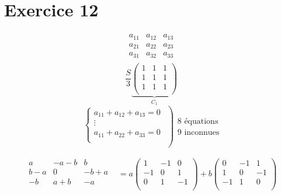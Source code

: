 \part{Exercice 12}

\[
	\begin{array}
		{c|c|c}
		a_{11}&a_{12}&a_{13}\\ \hline
		a_{21}&a_{22}&a_{23}\\ \hline
		a_{31}&a_{32}&a_{33}\\
	\end{array}
\]
\[
	\frac{S}{3}
		\underbrace{\left(\begin{array}
			{c|c|c}
			1&1&1\\\hline
			1&1&1\\\hline
			1&1&1\\
		\end{array}
	\right)}_{C_1}
\]
\[
	\left.
	\begin{array}{c}
		\begin{cases}
		a_{11}+a_{12}+a_{13} = 0\\
		\vdots\\
		a_{11}+a_{22}+a_{33} = 0\\
		\end{cases}\\
	\end{array} \right)
	\begin{array}{c}
		8 \text{ équations}\\
		9 \text{ inconnues}
	\end{array} 
\] 

\begin{align*}
	\begin{array}
		{c|c|c}
		a&-a-b&b\\ \hline
		b-a&0&-b+a\\ \hline
		-b&a+b&-a\\
	\end{array}
	&= a
	\left(\begin{array}
		{c|c|c}
		1&-1&0\\ \hline
		-1&0&1\\ \hline
		0&1&-1\\
	\end{array}\right)
	+b
	\left(\begin{array}{c|c|c}
		0&-1&1\\ \hline
		1&0&-1\\ \hline
		-1&1&0\\
	\end{array}\right)\\
\end{align*}

